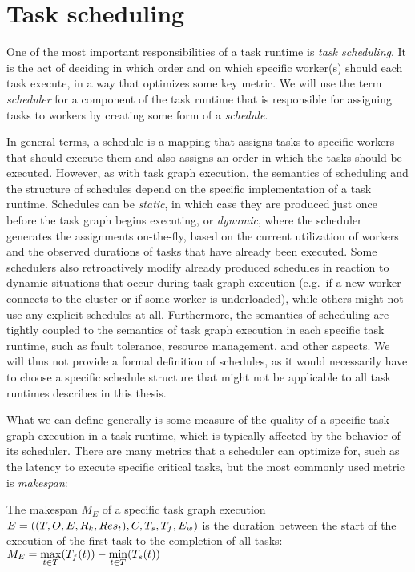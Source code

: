 \section{Task scheduling}
\label{sec:task-scheduling}
One of the most important responsibilities of a task runtime is \emph{task scheduling}. It is the
act of deciding in which order and on which specific worker(s) should each task execute, in a way
that optimizes some key metric. We will use the term \emph{scheduler} for a component of the
task runtime that is responsible for assigning tasks to workers by creating
some form of a \emph{schedule}.

In general terms, a schedule is a mapping that assigns tasks to specific
workers that should execute them and also assigns an order in which the tasks should be executed.
However, as with task graph execution, the semantics of scheduling and the structure of schedules
depend on the specific implementation of a task runtime. Schedules can be
\emph{static}, in which case they are produced just once before the task graph begins
executing, or \emph{dynamic}, where the scheduler generates the assignments on-the-fly,
based on the current utilization of workers and the observed durations of tasks that have already
been executed. Some schedulers also retroactively modify already produced schedules in reaction to
dynamic situations that occur during task graph execution (e.g.\ if a new worker connects to the
cluster or if some worker is underloaded), while others might not use any explicit schedules at
all. Furthermore, the semantics of scheduling are tightly coupled to the semantics of
task graph execution in each specific task runtime, such as fault tolerance, resource management,
and other aspects. We will thus not provide a formal definition of schedules, as it would
necessarily have to choose a specific schedule structure that might not be applicable to all
task runtimes describes in this thesis.

What we can define generally is some measure of the quality of a specific task graph execution
in a task runtime, which is typically affected by the behavior of its scheduler. There are many metrics
that a scheduler can optimize for, such as the latency to execute specific critical tasks, but the
most commonly used metric is \emph{makespan}:

\vspace{2mm} The makespan $M_E$ of a specific task graph execution
$E = ((T, O, E, R_k, Res_t), C, T_s, T_f, E_w)$ is the
duration between the start of the execution of the first task to the completion of all tasks: \\
$M_E = \max\limits_{t \in T}(T_f(t)) - \min\limits_{t \in T}(T_s(t))$

